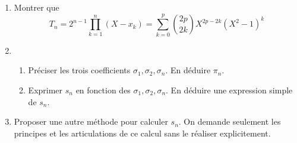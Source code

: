 \begin{enumerate}
 \item Montrer que
\begin{displaymath}
 T_n = 2^{n-1}\prod_{k=1}^{n}(X-x_k)
= \sum_{k=0}^{p}\binom{2p}{2k}X^{2p-2k}(X^2 -1)^k
\end{displaymath}
\item \begin{enumerate}
 \item Préciser les trois coefficients $\sigma_1, \sigma_2, \sigma_n$. En déduire $\pi_n$.
\item Exprimer $s_n$ en fonction des $\sigma_1,\sigma_2, \sigma_n$. En déduire une expression simple de $s_n$.
\end{enumerate}
\item Proposer une autre méthode pour calculer $s_n$. On demande seulement les principes et les articulations de ce calcul sans le réaliser explicitement.
\end{enumerate}


